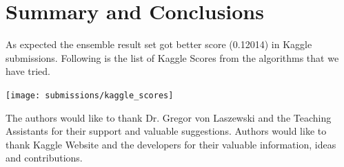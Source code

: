 \documentclass[sigconf]{acmart}
\begin{document}
	\section{Summary and Conclusions}
		
	As expected the ensemble result set got better score (0.12014) in Kaggle submissions. Following is the list of Kaggle Scores from the algorithms that we have tried.
	
	\begin{center}
		\texttt{[image: submissions/kaggle\_scores]}
	\end{center}
	
	\nocite{*}
	
	\begin{acks}	
			The authors would like to thank Dr. Gregor von Laszewski and the Teaching Assistants for their support and valuable suggestions. Authors would like to thank Kaggle Website and the developers for their valuable information, ideas and contributions.		
	\end{acks}


	
	 	

	
\end{document}
